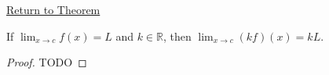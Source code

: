 \newpage
{}
\label{prf:scalar-multiple-rule-function-limits}

\begin{remark*}[Return]
\hyperref[thm:scalar-multiple-rule-function-limits]{Return to Theorem}
\end{remark*}

\begin{theorem*}
If $\lim_{x\to c}f(x)=L$ and $k\in\mathbb{R}$, then $\lim_{x\to c}(kf)(x)=kL$.
\end{theorem*}

\begin{proof}
TODO
\end{proof}
